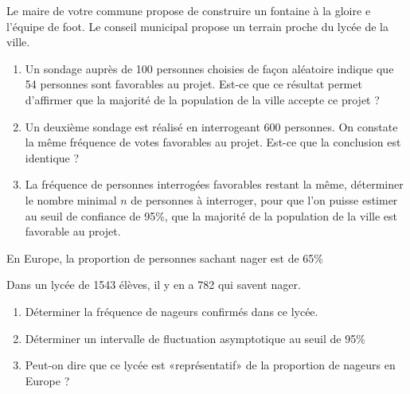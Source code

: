 \begin{question}[topic=probabilité]
  Le maire de votre commune propose de construire un fontaine à la gloire e
  l'équipe de foot. Le conseil municipal propose un terrain proche du lycée
  de la ville.

  \begin{enumerate}
    \item Un sondage auprès de 100 personnes choisies de façon aléatoire
      indique que 54 personnes sont favorables au projet. Est-ce que ce
      résultat permet d'affirmer que la majorité de la population de la
      ville accepte ce projet ?
    \item Un deuxième sondage est réalisé en interrogeant 600 personnes. On
      constate la même fréquence de votes favorables au projet. Est-ce que
      la conclusion est identique ?
    \item La fréquence de personnes interrogées favorables restant la même,
      déterminer le nombre minimal $n$ de personnes à interroger, pour que
      l'on puisse estimer au seuil de confiance de 95\%, que la majorité de
      la population de la ville est favorable au projet.
  \end{enumerate}
\end{question}

\begin{question}[topic=probabilité]
  En Europe, la proportion de personnes sachant nager est de 65\%

  Dans un lycée de 1543 élèves, il y en a 782 qui savent nager.

  \begin{enumerate}
    \item Déterminer la fréquence de nageurs confirmés dans ce lycée.
    \item Déterminer un intervalle de fluctuation asymptotique au seuil de
      95\%
    \item Peut-on dire que ce lycée est «représentatif» de la proportion de
      nageurs en Europe ?
  \end{enumerate}
\end{question}


